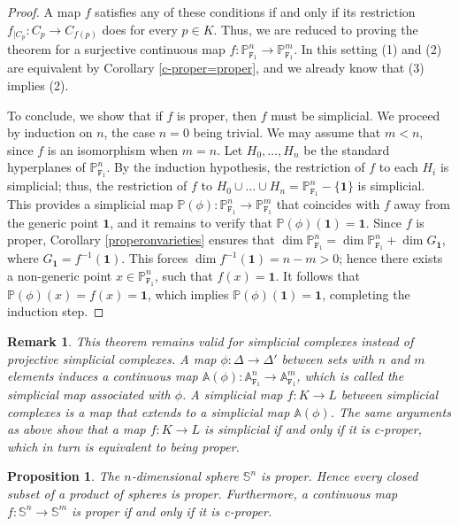 \documentclass[amssymb,amscd,11pt,20pt]{amsart}
\newcommand{\FF}{{\mathtt F}}
\newcommand{\PP}{\mathbb P}
\newcommand{\0}{\mathbf 0}
\newcommand{\un}{\mathbf 1}
\newcommand{\A}{{\mathbb A}}
\theoremstyle{plain}
\newtheorem{prop}[thm]{Proposition}
\newtheorem{rem}[thm]{Remark}
\numberwithin{equation}{thm}
\begin{document}
\begin{proof} A map $f$ satisfies any of these conditions if and only if its restriction $f_{\vert C_p}\colon C_p\to C_{f(p)}$ does for every $p\in K$. Thus, we are reduced to proving the theorem for a surjective continuous map $f\colon \PP^n_{\FF_1}\to \PP^m_{\FF_1}$. In this setting (1) and (2) are equivalent by Corollary \ref{c-proper=proper}, and we already know that (3) implies (2). 

To conclude, we show that if $f$ is proper, then $f$ must be simplicial. We proceed by induction on $n$, the case $n=0$ being trivial. We may assume that $m<n$, since $f$ is an isomorphism when $m=n$. Let $H_0,\dots,H_n$ be the standard hyperplanes of $\PP^n_{\FF_1}$. By the induction hypothesis, the restriction of $f$ to each $H_i$ is simplicial; thus,  the restriction of $f$ to $H_0\cup\dots\cup H_n=\PP^n_{\FF_1}-\{\un\}$ is simplicial. This provides a simplicial map $\PP(\phi)\colon \PP^n_{\FF_1}\to \PP^m_{\FF_1}$ that coincides with $f$ away from the generic point $\mathbf{1}$, and it remains to verify that $\PP(\phi)(\un)=\un$. Since $f$ is proper, Corollary \ref{properonvarieties} ensures that  $\dim \PP^n_{\FF_1}=\dim \PP^n_{\FF_1}+\dim G_\un$, where  $G_\un=f^{-1}(\un)$. This forces  $\dim f^{-1}(\un)=n-m>0$; hence there exists a non-generic point $x\in \PP^n_{\FF_1}$,   such that $f(x)=\un$. It follows that $\PP(\phi)(x)=f(x)=\un$, which implies $\PP(\phi)(\un)=\un$, completing the induction step.
 \end{proof}
 
 \begin{rem}\label{simplicial=proper2} {\rm This theorem remains valid for simplicial complexes instead of projective simplicial complexes. A map $\phi\colon \Delta\to\Delta' $ between sets with $n$ and $m$ elements induces a continuous map $\A(\phi)\colon \A^n_{\FF_1}\to \A^m_{\FF_1} $, which is called the simplicial map associated with $\phi$. A simplicial map $f\colon K\to L$ between simplicial complexes is a map that extends to a simplicial map $\A(\phi)$. The same arguments as above show that a map $f\colon K\to L$ is simplicial if and only if it is c-proper, which in turn is equivalent to being proper. }
 \end{rem}

\begin{prop} The $n$-dimensional sphere  ${\mathbb S}^n$ is proper. Hence every closed subset of a product of spheres is proper. Furthermore, a continuous map $f\colon {\mathbb S}^n\to {\mathbb S}^m$ is proper if and only if it is c-proper.
\end{prop}
\end{document}
